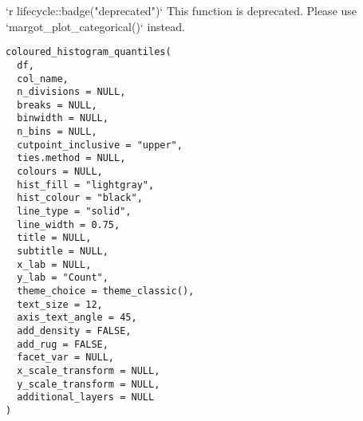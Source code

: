 \documentclass[a4paper]{book}
\begin{document}
%
\begin{Description}
`r lifecycle::badge("deprecated")`
This function is deprecated. Please use `margot\_plot\_categorical()` instead.
\end{Description}
%
\begin{Usage}
\begin{verbatim}
coloured_histogram_quantiles(
  df,
  col_name,
  n_divisions = NULL,
  breaks = NULL,
  binwidth = NULL,
  n_bins = NULL,
  cutpoint_inclusive = "upper",
  ties.method = NULL,
  colours = NULL,
  hist_fill = "lightgray",
  hist_colour = "black",
  line_type = "solid",
  line_width = 0.75,
  title = NULL,
  subtitle = NULL,
  x_lab = NULL,
  y_lab = "Count",
  theme_choice = theme_classic(),
  text_size = 12,
  axis_text_angle = 45,
  add_density = FALSE,
  add_rug = FALSE,
  facet_var = NULL,
  x_scale_transform = NULL,
  y_scale_transform = NULL,
  additional_layers = NULL
)
\end{verbatim}
\end{Usage}
%
\end{document}
